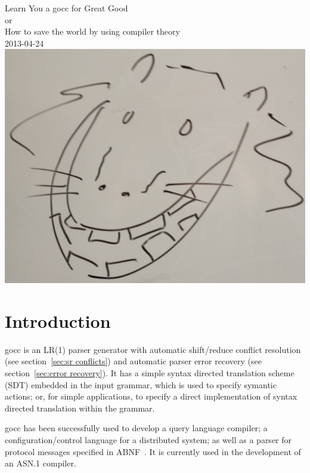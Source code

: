 \documentclass[12pt]{article}
\begin{document}
\begin{center}
	{\Huge Learn You a gocc for Great Good} \\
	{\large or \\
	How to save the world by using compiler theory \\
	\vspace{1cm}
	2013-04-24}\\
	\vspace{1cm}
	\includegraphics[scale=.1]{gocc}
\end{center}
\tableofcontents

\newcommand{\TBD}{\textcolor{red}{TBD}}
\newcommand{\TBDx}[1]{\textcolor{red}{TBD:} #1}
\newcommand{\Go}{{\em Go}\ }
\newcommand{\Code}[1]{{\bf #1} } 
\newcommand{\gocc}{{\em gocc}\ }
\newcommand{\Clang}{{\em C} language}

\section{Introduction}
	gocc is an LR(1) parser generator with automatic shift/reduce conflict resolution (see section~\ref{sec:sr conflicts}) and automatic parser error recovery (see section~\ref{sec:error recovery}). It has a simple syntax directed translation scheme (SDT) embedded in the input grammar, which is used to specify symantic actions; or, for simple applications, to specify a direct implementation of syntax directed translation within the grammar.

	gocc has been successfully used to develop a query language compiler; a configuration/control language for a distributed system; as well as a parser for protocol messages specified in ABNF~\cite{ABNF}. It is currently used in the development of an ASN.1 compiler.
\end{document}
